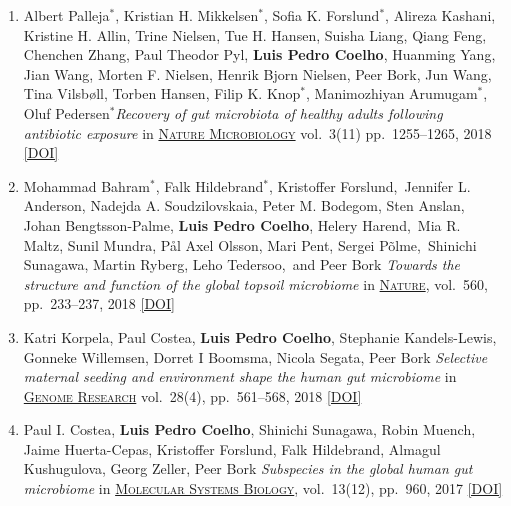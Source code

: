 \documentclass{article}
\newcommand\showdoi[1]{%
    \href{http://dx.doi.org/#1}{[DOI]}%
}
\newcommand\pubname[1]{\textsc{\uline{#1}}}
\newcommand\contribution[1]{\relax}
\newcommand\costar{${}^{*}$}
\begin{document}
\begin{enumerate}[resume]
\item Albert Palleja\costar, Kristian H. Mikkelsen\costar, Sofia K.
Forslund\costar, Alireza Kashani, Kristine H. Allin, Trine Nielsen, Tue H.
Hansen, Suisha Liang, Qiang Feng, Chenchen Zhang, Paul Theodor Pyl,
\textbf{Luis Pedro Coelho}, Huanming Yang, Jian Wang, Morten F. Nielsen, Henrik
Bjorn Nielsen, Peer Bork, Jun Wang, Tina Vilsbøll, Torben Hansen, Filip K.
Knop\costar, Manimozhiyan Arumugam\costar, Oluf Pedersen\costar \emph{Recovery
of gut microbiota of healthy adults following antibiotic exposure} in
\pubname{Nature Microbiology} vol.\ 3(11) pp.\ 1255--1265, 2018
\showdoi{10.1038/s41564-018-0257-9}
\contribution{I performed statistical analyses of the microbiome data.}

\item Mohammad Bahram\costar, Falk Hildebrand\costar, Kristoffer
Forslund, Jennifer L. Anderson, Nadejda A. Soudzilovskaia, Peter M. Bodegom,
Sten Anslan, Johan Bengtsson-Palme, \textbf{Luis Pedro Coelho}, Helery
Harend, Mia R. Maltz, Sunil Mundra, Pål Axel Olsson, Mari Pent, Sergei
Põlme, Shinichi Sunagawa, Martin Ryberg, Leho Tedersoo, and Peer Bork
\emph{Towards the structure and function of the global topsoil microbiome} in
\pubname{Nature}, vol.\ 560, pp.\ 233--237, 2018
\showdoi{10.1038/s41586-018-0386-6}
\contribution{I contributed to the analysis of metagenomics data, in particular
building a gene catalogue of the soil microbiome.}

\item Katri Korpela, Paul Costea, \textbf{Luis Pedro Coelho}, Stephanie
Kandels-Lewis, Gonneke Willemsen, Dorret I Boomsma, Nicola Segata, Peer Bork
\emph{Selective maternal seeding and environment shape the human gut
microbiome} in \pubname{Genome Research} vol.\ 28(4), pp.\ 561--568, 2018
\showdoi{10.1101/gr.233940.117}
\contribution{I contributed to the analysis and interpretation of the
metagenomics data.}

\item Paul I. Costea, \textbf{Luis Pedro Coelho}, Shinichi Sunagawa, Robin
Muench, Jaime Huerta-Cepas, Kristoffer Forslund, Falk Hildebrand, Almagul
Kushugulova, Georg Zeller, Peer Bork \emph{Subspecies in the global human gut
microbiome} in \pubname{Molecular Systems Biology}, vol.\ 13(12), pp.\ 960,
2017 \showdoi{10.15252/msb.20177589}
\contribution{I contributed to the analysis and interpretation of the
metagenomics data and discussions of statistical methodology.}



\end{enumerate}
\end{document}
